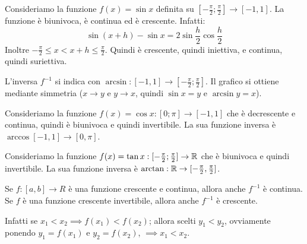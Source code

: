 \begin{example}
Consideriamo la funzione $f(x) = \sin x$ definita su $[-\frac{\pi}{2} ; \frac{\pi}{2}] \to [-1, 1]$. La funzione è biunivoca, è continua ed è crescente. Infatti:
\begin{equation*}
\sin (x+h) - \sin x  = 2 \sin \frac{h}{2} \cos \frac{h}{2}
\end{equation*}
Inoltre $-\frac{\pi}{2} \le x < x + h \le \frac{\pi}{2}$. Quindi è crescente, quindi iniettiva, e continua, quindi suriettiva.

L'inversa $f^{-1}$ si indica con $\arcsin: [-1, 1] \to [-\frac{\pi}{2}; \frac{\pi}{2}]$. Il grafico si ottiene mediante simmetria ($x \to y$ e $y \to x$, quindi $\sin x = y$ e $\arcsin y = x$).
\end{example}

\begin{example}
Consideriamo la funzione $f(x) = \cos x : [0; \pi] \to [-1, 1]$ che è decrescente e continua, quindi è biunivoca e quindi invertibile. La sua funzione inversa è $\arccos [-1, 1] \to [0, \pi]$.
\end{example}

\begin{example}
Consideriamo la funzione $f(x) = \tan x : [-\frac{\pi}{2}; \frac{\pi}{2}] \to \mathbb R$ che è biunivoca e quindi invertibile. La sua funzione inversa è $\arctan : \mathbb R \to [-\frac{\pi}{2}, \frac{\pi}{2}]$.
\end{example}

\begin{theorem}
Se $f: [a, b] \to R$ è una funzione crescente e continua, allora anche $f^{-1}$ è continua. Se $f$ è una funzione crescente invertibile, allora anche $f^{-1}$ è crescente.
\end{theorem}

Infatti se $x_1 < x_2 \implies f(x_1) < f(x_2)$; allora scelti $y_1 < y_2$, ovviamente ponendo $y_1 = f(x_1)$ e $y_2 = f(x_2)$, $\implies x_1 < x_2$.